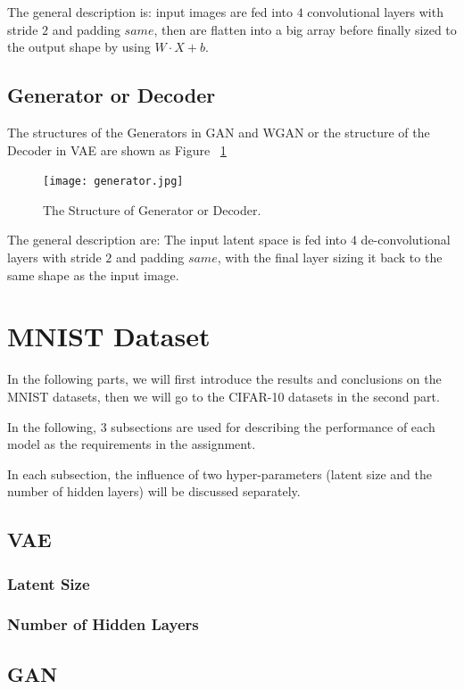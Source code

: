 \documentclass[12pt,letterpaper]{article}
\begin{document}
The general description is: input images are fed into $4$ convolutional layers with stride $2$ and padding $same$, then are flatten into a big array before finally sized to the output shape by using $W \cdot X + b$.

\subsection{Generator or Decoder}

The structures of the Generators in GAN and WGAN or the structure of the Decoder in VAE are shown as Figure ~\ref{fig:gen}
\begin{figure}[h]
    \centering
    \texttt{[image: generator.jpg]}
    \caption{\small The Structure of Generator or Decoder.}
    \label{fig:gen}
\end{figure}

The general description are: The input latent space is fed into $4$ de-convolutional layers with stride $2$ and padding $same$, with the final layer sizing it back to the same shape as the input image.

\section{MNIST Dataset}

In the following parts, we will first introduce the results and conclusions on the MNIST datasets, then we will go to the CIFAR-10 datasets in the second part.

In the following, $3$ subsections are used for describing the performance of each model as the requirements in the assignment.

In each subsection, the influence of two hyper-parameters (latent size and the number of hidden layers) will be discussed separately.

\subsection{VAE}

\subsubsection{Latent Size}

\subsubsection{Number of Hidden Layers}

\subsection{GAN}
\end{document}
